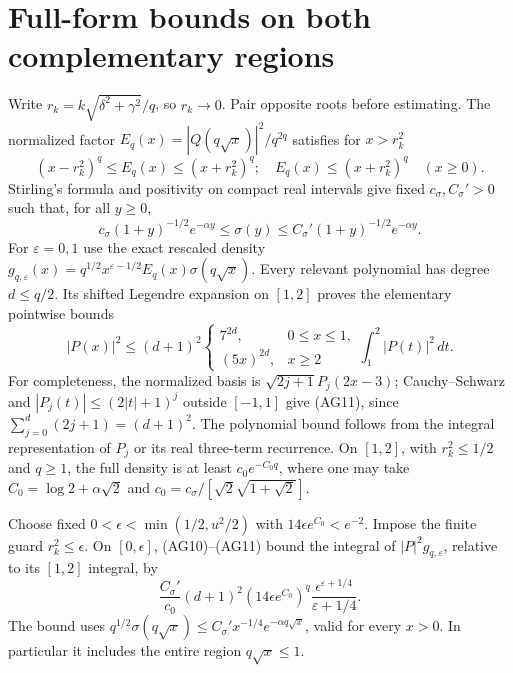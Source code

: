 \documentclass[11pt,a4paper]{article}
\providecommand{\dd}{\,d}
\begin{document}
\section{Full-form bounds on both complementary regions}
Write $r_k=k\sqrt{\delta^2+\gamma^2}/q$, so $r_k\to0$.
Pair opposite roots before estimating. The normalized factor
$E_q(x)=|Q(q\sqrt x)|^2/q^{2q}$ satisfies for $x>r_k^2$
\begin{equation}\tag{AG10}
 (x-r_k^2)^q\le E_q(x)\le(x+r_k^2)^q;
 \quad E_q(x)\le(x+r_k^2)^q\quad(x\ge0).
\end{equation}
Stirling's formula and positivity on compact real intervals give fixed
$c_\sigma,C_\sigma'>0$ such that, for all $y\ge0$,
\[
 c_\sigma(1+y)^{-1/2}e^{-\alpha y}
 \le\sigma(y)\le C_\sigma'(1+y)^{-1/2}e^{-\alpha y}.
\]
For $\varepsilon=0,1$ use the exact rescaled density
$g_{q,\varepsilon}(x)=q^{1/2}x^{\varepsilon-1/2}E_q(x)\sigma(q\sqrt x)$.
Every relevant polynomial has degree $d\le q/2$. Its shifted Legendre
expansion on $[1,2]$ proves the elementary pointwise bounds
\begin{equation}\tag{AG11}
 |P(x)|^2\le(d+1)^2
 \begin{cases}7^{2d},&0\le x\le1,\\(5x)^{2d},&x\ge2\end{cases}
 \int_1^2|P(t)|^2\dd t.
\end{equation}
For completeness, the normalized basis is
$\sqrt{2j+1}P_j(2x-3)$; Cauchy--Schwarz and
$|P_j(t)|\le(2|t|+1)^j$ outside $[-1,1]$ give (AG11), since
$\sum_{j=0}^d(2j+1)=(d+1)^2$. The polynomial bound follows from the
integral representation of $P_j$ or its real three-term recurrence.
On $[1,2]$, with $r_k^2\le1/2$ and $q\ge1$, the full density is at least
$c_0e^{-C_0q}$, where one may take
$C_0=\log2+\alpha\sqrt2$ and
$c_0=c_\sigma/[\sqrt2\sqrt{1+\sqrt2}]$.

Choose fixed $0<\epsilon<\min(1/2,u^2/2)$ with
$14\epsilon e^{C_0}<e^{-2}$. Impose the finite guard $r_k^2\le\epsilon$.
On $[0,\epsilon]$, (AG10)--(AG11) bound the integral of
$|P|^2g_{q,\varepsilon}$, relative to its $[1,2]$ integral, by
\begin{equation}\tag{AG12}
 \frac{C_\sigma'}{c_0}(d+1)^2
 (14\epsilon e^{C_0})^q
 \frac{\epsilon^{\varepsilon+1/4}}{\varepsilon+1/4}.
\end{equation}
The bound uses $q^{1/2}\sigma(q\sqrt x)\le
C_\sigma'x^{-1/4}e^{-\alpha q\sqrt x}$, valid for every $x>0$.
In particular it includes the entire region $q\sqrt x\le1$.
\end{document}
